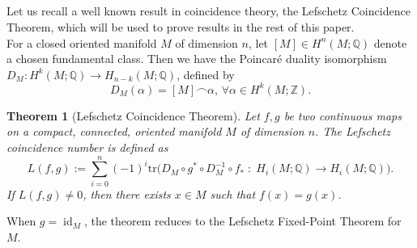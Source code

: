 \documentclass{amsart}
\newtheorem{theorem}{Theorem}[section]
\begin{document}
	\subsection{} Let us recall a well known result in coincidence theory, the Lefschetz Coincidence Theorem, which will be used to prove results in the rest of this paper.\\
	
	For a closed oriented manifold $M$ of dimension $n$, let $[M]\in H^n(M;\mathbb Q)$ denote a chosen fundamental class. Then we have the Poincar\'e  duality isomorphism $D_M:H^k(M;\mathbb Q)\to H_{n-k}(M;\mathbb Q)$, defined by 
	\begin{equation}\label{poinc dua}
		D_M(\alpha)=[M]\frown \alpha, \, \forall \alpha\in H^k(M;\mathbb Z).
	\end{equation}

	
	\begin{theorem}[Lefschetz Coincidence Theorem]\label{LCT}
		Let $f,g$ be two continuous maps on a compact, connected, oriented manifold $M$ of  dimension $n$. The Lefschetz coincidence number is defined as 
		$$L(f,g):= \sum_{i=0}^{n} (-1)^i \mathrm{tr}\big(D_M \circ g^* \circ D_M^{-1} \circ f_* \; : \; H_i(M;\mathbb{Q}) \longrightarrow H_i(M;\mathbb{Q})\big).
		$$ If $L(f,g) \neq 0$, then there exists $x \in M$ such that $f(x) = g(x)$.
	\end{theorem}
	When  $g=\operatorname{id}_M$, the theorem reduces to the Lefschetz Fixed-Point Theorem for $M$.\\
	
\end{document}

